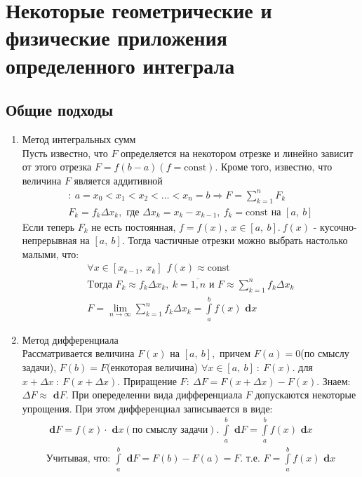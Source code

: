 \documentclass[a4paper,12pt, centered]{bookest}
\theoremstyle{remark}
\newcommand\dx{\textbf{ d}x}
\newcommand\dy{\textbf{ d}}
\newcommand\const{\textrm{const}}
\begin{document}
\section{Некоторые геометрические и физические приложения определенного интеграла}
\subsection{Общие подходы}
\begin{enumerate}
	\item Метод интегральных сумм \\ Пусть известно, что $F$ определяется на некотором отрезке и линейно зависит от этого отрезка $F=f(b-a)(f=\const).$ Кроме того, известно, что величина $F$ является аддитивной 
		\begin{gather*}
[a,\>b]:\>a=x_0<x_1<x_2<\dots<x_n=b\Rightarrow F=\sum\limits_{k=1}^nF_k\\F_k=f_k\Delta x_k,\textrm{ где } \Delta x_k=x_k-x_{k-1},\>f_k=\const\textrm{ на }[a,\>b]
\end{gather*}
		Eсли теперь $F_k$ не есть постоянная, $f=f(x),\>x\in[a,\>b].\>f(x)$ - кусочно-непрерывная на $[a,\>b].$ Тогда частичные отрезки можно выбрать настолько малыми, что: \begin{gather*}
			\forall x\in[x_{k-1},\>x_k]\>\>f(x)\approx\const\\\textrm{Tогда } F_k\approx f_k\Delta x_k,\>k=\overline{1,n} \textrm{ и } F\approx\sum\limits_{k=1}^nf_k\Delta x_k\\F=\lim\limits_{n\to\infty}\sum\limits_{k=1}^nf_k\Delta x_k=\int\limits_a^bf(x)\dx
		\end{gather*}
		\item Метод дифференциала \\ Рассматривается величина $F(x)$ на $[a,\>b],$ причем $F(a)=0$(по смыслу задачи), $F(b)=F$(енкоторая величина) $\forall x\in[a,\>b]\>:\>F(x).$ для $x+\Delta x\>:\>F(x+\Delta x).$ Приращение $F:\>\Delta F=F(x+\Delta x)-F(x).$ Знаем: $\Delta F\approx \dy F$. При опеределенни вида дифференциала $F$ допускаются некоторые упрощения. При этом дифференциал записывается в виде: \begin{gather*}
			\dy F = f(x)\cdot \dx(\textrm{по смыслу задачи}).\>\int\limits_a^b\dy F=\int\limits_a^bf(x)\dx\\\textrm{Учитывая, что: } \int\limits_a^b\dy F=F(b)-F(a)=F. \textrm{ т.е. } F=\int\limits_a^bf(x)\dx  
		\end{gather*}
\end{enumerate}
\end{document}
